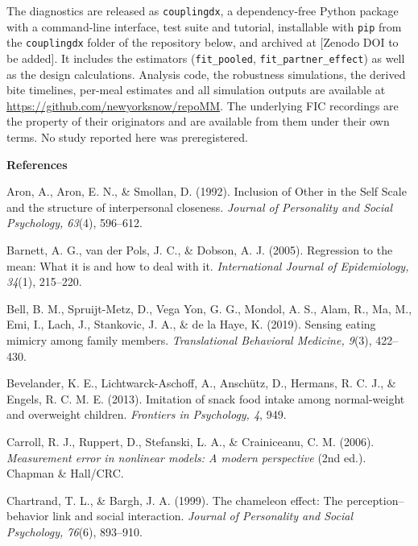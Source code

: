 \documentclass[12pt]{article}
\begin{document}
The diagnostics are released as \texttt{couplingdx}, a dependency-free Python
package with a command-line interface, test suite and tutorial, installable with
\texttt{pip} from the \texttt{couplingdx} folder of the repository below, and
archived at [Zenodo DOI to be added]. It includes the estimators
(\texttt{fit\_pooled}, \texttt{fit\_partner\_effect}) as well as the design
calculations. Analysis code, the
robustness simulations, the derived bite timelines, per-meal estimates and all
simulation outputs are available at
\url{https://github.com/newyorksnow/repoMM}. The underlying FIC recordings are the
property of their originators and are available from them under their own terms.
No study reported here was preregistered.

\newpage

\begin{center}\textbf{References}\end{center}
\begingroup
\singlespacing
\setlength{\parindent}{-0.5in}
\setlength{\leftskip}{0.5in}
\setlength{\parskip}{4pt}

Aron, A., Aron, E. N., \& Smollan, D. (1992). Inclusion of Other in the Self Scale and the structure of interpersonal closeness. \emph{Journal of Personality and Social Psychology, 63}(4), 596--612.

Barnett, A. G., van der Pols, J. C., \& Dobson, A. J. (2005). Regression to the mean: What it is and how to deal with it. \emph{International Journal of Epidemiology, 34}(1), 215--220.

Bell, B. M., Spruijt-Metz, D., Vega Yon, G. G., Mondol, A. S., Alam, R., Ma, M., Emi, I., Lach, J., Stankovic, J. A., \& de la Haye, K. (2019). Sensing eating mimicry among family members. \emph{Translational Behavioral Medicine, 9}(3), 422--430.

Bevelander, K. E., Lichtwarck-Aschoff, A., Anschütz, D., Hermans, R. C. J., \& Engels, R. C. M. E. (2013). Imitation of snack food intake among normal-weight and overweight children. \emph{Frontiers in Psychology, 4}, 949.

Carroll, R. J., Ruppert, D., Stefanski, L. A., \& Crainiceanu, C. M. (2006). \emph{Measurement error in nonlinear models: A modern perspective} (2nd ed.). Chapman \& Hall/CRC.

Chartrand, T. L., \& Bargh, J. A. (1999). The chameleon effect: The perception--behavior link and social interaction. \emph{Journal of Personality and Social Psychology, 76}(6), 893--910.
\end{document}
